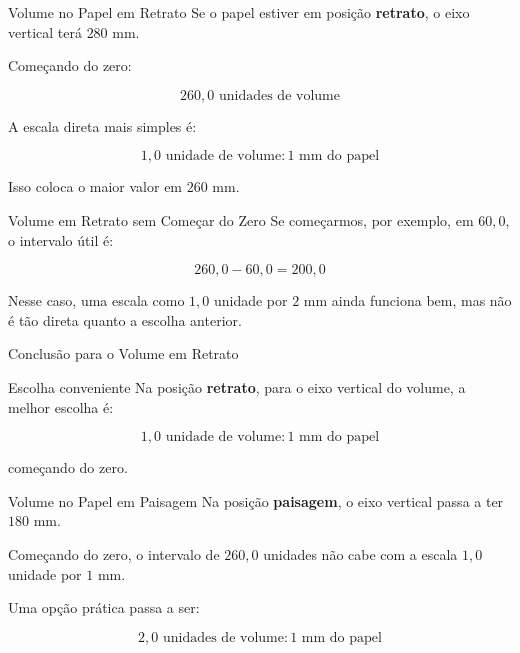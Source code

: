 \documentclass[aspectratio=169]{beamer}
\begin{document}
\begin{frame}{Volume no Papel em Retrato}
Se o papel estiver em posição \textbf{retrato}, o eixo vertical terá \(280\) mm.

\bigskip

Começando do zero:

\begin{equation}
260{,}0 \text{ unidades de volume}
\end{equation}

A escala direta mais simples é:

\begin{equation}
1{,}0 \text{ unidade de volume} : 1 \text{ mm do papel}
\end{equation}

Isso coloca o maior valor em \(260\) mm.
\end{frame}

\begin{frame}{Volume em Retrato sem Começar do Zero}
Se começarmos, por exemplo, em \(60{,}0\), o intervalo útil é:

\begin{equation}
260{,}0 - 60{,}0 = 200{,}0
\end{equation}

Nesse caso, uma escala como \(1{,}0\) unidade por \(2\) mm ainda funciona bem, mas não é tão direta quanto a escolha anterior.
\end{frame}

\begin{frame}{Conclusão para o Volume em Retrato}
\begin{block}{Escolha conveniente}
Na posição \textbf{retrato}, para o eixo vertical do volume, a melhor escolha é:

\begin{equation}
1{,}0 \text{ unidade de volume} : 1 \text{ mm do papel}
\end{equation}

começando do zero.
\end{block}
\end{frame}

\begin{frame}{Volume no Papel em Paisagem}
Na posição \textbf{paisagem}, o eixo vertical passa a ter \(180\) mm.

\bigskip

Começando do zero, o intervalo de \(260{,}0\) unidades não cabe com a escala
\(1{,}0\) unidade por \(1\) mm.

\bigskip

Uma opção prática passa a ser:

\begin{equation}
2{,}0 \text{ unidades de volume} : 1 \text{ mm do papel}
\end{equation}
\end{frame}
\end{document}

